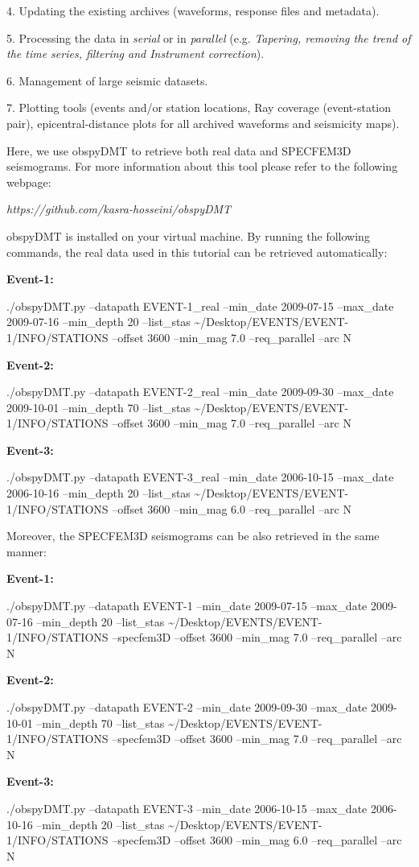 \documentclass{article}
\begin{document}
4. Updating the existing archives (waveforms, response files and metadata).

5. Processing the data in \textit{serial} or in \textit{parallel} (e.g. \textit{Tapering, 
removing the trend of the time series, filtering and Instrument correction}).

6. Management of large seismic datasets.

7. Plotting tools (events and/or station locations, Ray coverage (event-station 
pair), epicentral-distance plots for all archived waveforms and seismicity maps).

\vspace{13pt}
Here, we use obspyDMT to retrieve both real data and SPECFEM3D seismograms. For 
more information about this tool please refer to the following webpage:

{\color{color18} \emph{https://github.com/kasra-hosseini/obspyDMT}} 

obspyDMT is installed on your virtual machine. By running the following commands, 
the real data used in this tutorial can be retrieved automatically:

\textbf{Event-1:}

./obspyDMT.py --datapath EVENT-1\_real --min\_date 2009-07-15 --max\_date 2009-07-16 
--min\_depth 20 --list\_stas \textasciitilde{}/Desktop/EVENTS/EVENT-1/INFO/STATIONS 
--offset 3600 --min\_mag 7.0 --req\_parallel --arc N

\textbf{Event-2:}

./obspyDMT.py --datapath EVENT-2\_real --min\_date 2009-09-30 --max\_date 2009-10-01 
--min\_depth 70 --list\_stas \textasciitilde{}/Desktop/EVENTS/EVENT-1/INFO/STATIONS 
--offset 3600 --min\_mag 7.0 --req\_parallel --arc N

\textbf{Event-3:}

./obspyDMT.py --datapath EVENT-3\_real --min\_date 2006-10-15 --max\_date 2006-10-16 
--min\_depth 20 --list\_stas \textasciitilde{}/Desktop/EVENTS/EVENT-1/INFO/STATIONS 
--offset 3600 --min\_mag 6.0 --req\_parallel --arc N

Moreover, the SPECFEM3D seismograms can be also retrieved in the same manner:

\textbf{Event-1:}

./obspyDMT.py --datapath EVENT-1 --min\_date 2009-07-15 --max\_date 2009-07-16 
--min\_depth 20 --list\_stas \textasciitilde{}/Desktop/EVENTS/EVENT-1/INFO/STATIONS 
--specfem3D --offset 3600 --min\_mag 7.0 --req\_parallel --arc N

\textbf{Event-2:}

./obspyDMT.py --datapath EVENT-2 --min\_date 2009-09-30 --max\_date 2009-10-01 
--min\_depth 70 --list\_stas \textasciitilde{}/Desktop/EVENTS/EVENT-1/INFO/STATIONS 
--specfem3D --offset 3600 --min\_mag 7.0 --req\_parallel --arc N

\textbf{Event-3:}

./obspyDMT.py --datapath EVENT-3 --min\_date 2006-10-15 --max\_date 2006-10-16 
--min\_depth 20 --list\_stas \textasciitilde{}/Desktop/EVENTS/EVENT-1/INFO/STATIONS 
--specfem3D --offset 3600 --min\_mag 6.0 --req\_parallel --arc N
\end{document}
